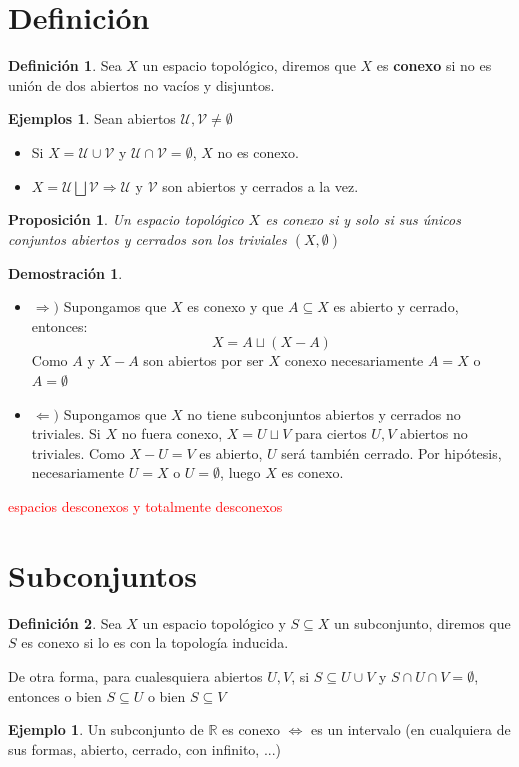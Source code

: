 \documentclass[12pt,twoside]{report}
\newcommand\mc[1]{\mathcal{#1}}
\theoremstyle{azul}
\theoremstyle{azul2}
\theoremstyle{plain}
\newtheorem*{prop}{Proposición}
\theoremstyle{definition}
\newtheorem*{eje}{Ejemplo}
\newtheorem*{ejes}{Ejemplos}
\newtheorem*{defi}{Definición}
\newtheorem*{dem}{Demostración}
\theoremstyle{remark}
\begin{document}
\section{Definición} \label{conexo}
\begin{defi}
Sea $X$ un espacio topológico, diremos que $X$ es \textbf{conexo} si no es unión de dos abiertos no vacíos y disjuntos.
\end{defi}
\begin{ejes} Sean abiertos $\mc{U}, \mc{V} \neq \emptyset $ \vspace{-4mm}
\begin{itemize}
    \item Si $X=\mc{U} \cup \mc{V}$ y $\mc{U} \cap \mc{V} = \emptyset$, $X$ no es conexo.
    \item $X = \mc{U} \bigsqcup \mc{V} \Rightarrow \mc{U} \text{ y } \mc{V}$ son abiertos y cerrados a la vez.
\end{itemize}
\end{ejes}
\begin{prop}
Un espacio topológico $X$ es conexo si y solo si sus únicos conjuntos abiertos y cerrados son los triviales $(X, \emptyset)$
\end{prop}
\begin{dem}\:\vspace{-5mm}
\begin{itemize}
    \item $\Rightarrow)$ Supongamos que $X$ es conexo y que $A\subseteq X$ es abierto y cerrado, entonces:
    $$X=A\sqcup (X-A)$$
    Como $A$ y $X-A$ son abiertos por ser $X$ conexo necesariamente $A=X$ o $A=\emptyset$
    \item $\Leftarrow)$ Supongamos que $X$ no tiene subconjuntos abiertos y cerrados no triviales. Si $X$ no fuera conexo, $X=U\sqcup V$ para ciertos $U,V$ abiertos no triviales. Como $X-U=V$ es abierto, $U$ será también cerrado. Por hipótesis, necesariamente $U=X$ o $U=\emptyset$, luego $X$ es conexo. 
\end{itemize}
\end{dem}
\textcolor{red}{espacios desconexos y totalmente desconexos}
\section{Subconjuntos}
\begin{defi}
Sea $X$ un espacio topológico y $ S \subseteq X$ un subconjunto, diremos que $S$ es conexo si lo es con la topología inducida. 

De otra forma, para cualesquiera abiertos $U, V$, si $S \subseteq U \cup V$ y $S \cap U \cap V = \emptyset$, entonces o bien $S \subseteq U$ o bien $S \subseteq V$
\end{defi}
\begin{eje}
     Un subconjunto de $\mathbb{R}$ es conexo $\iff$ es un intervalo (en cualquiera de sus formas, abierto, cerrado, con infinito, ...)
\end{eje}
\end{document}
